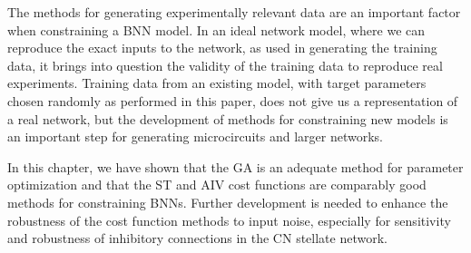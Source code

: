 The methods for generating experimentally relevant data are an important factor
when constraining a BNN model. In an ideal network model, where we can reproduce
the exact inputs to the network, as used in generating the training data, it
brings into question the validity of the training data to reproduce real
experiments.  Training data from an existing model, with target parameters
chosen randomly as performed in this paper, does not give us a representation of
a real network, but the development of methods for constraining new models is an
important step for generating microcircuits and larger networks.

\smallskip{}

In this chapter, we have shown that the GA is an adequate method for parameter
optimization and that the ST and AIV cost functions are comparably good methods
for constraining BNNs. Further development is needed to enhance the robustness
of the cost function methods to input noise, especially for sensitivity and
robustness of inhibitory connections in the CN stellate network.


